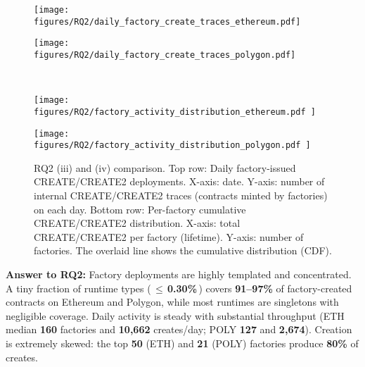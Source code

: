 \documentclass[acmsmall, screen]{acmart}
\begin{document}
	\begin{figure*}[t]
		\centering
		\begin{minipage}{0.49\textwidth}
			\centering
			\texttt{[image: figures/RQ2/daily\_factory\_create\_traces\_ethereum.pdf]}
		\end{minipage}\hfill
		\begin{minipage}{0.49\textwidth}
			\centering
			\texttt{[image: figures/RQ2/daily\_factory\_create\_traces\_polygon.pdf]}
		\end{minipage}
		\\
		\begin{minipage}{0.49\textwidth}
			\centering
			\texttt{[image: 
				figures/RQ2/factory\_activity\_distribution\_ethereum.pdf
			]}
		\end{minipage}\hfill
		\begin{minipage}{0.49\textwidth}
			\centering
			\texttt{[image: 
				figures/RQ2/factory\_activity\_distribution\_polygon.pdf
			]}
		\end{minipage}
		\caption{RQ2 (iii) and (iv) comparison. Top row: Daily factory-issued CREATE/CREATE2 deployments.
		X-axis: date. Y-axis: number of internal CREATE/CREATE2 traces (contracts minted by factories) on
		each day. Bottom row: Per-factory cumulative CREATE/CREATE2 distribution. X-axis: total CREATE/CREATE2
		per factory (lifetime). Y-axis: number of factories. The overlaid line shows the cumulative distribution
			(CDF).}
		\label{fig:rq2_group2}
	\end{figure*}

	\begin{answerbox}
		\textbf{Answer to RQ2:} Factory deployments are highly templated and concentrated. A tiny fraction
		of runtime types (\,$\le$\,\textbf{0.30\%}\,) covers \textbf{91--97\%} of factory-created contracts
		on Ethereum and Polygon, while most runtimes are singletons with negligible coverage. Daily activity
		is steady with substantial throughput (ETH median \textbf{160} factories and \textbf{10{,}662}
		creates/day; POLY \textbf{127} and \textbf{2{,}674}). Creation is extremely skewed: the top
		\textbf{50} (ETH) and \textbf{21} (POLY) factories produce \textbf{80\%} of creates.
	\end{answerbox}
\end{document}
